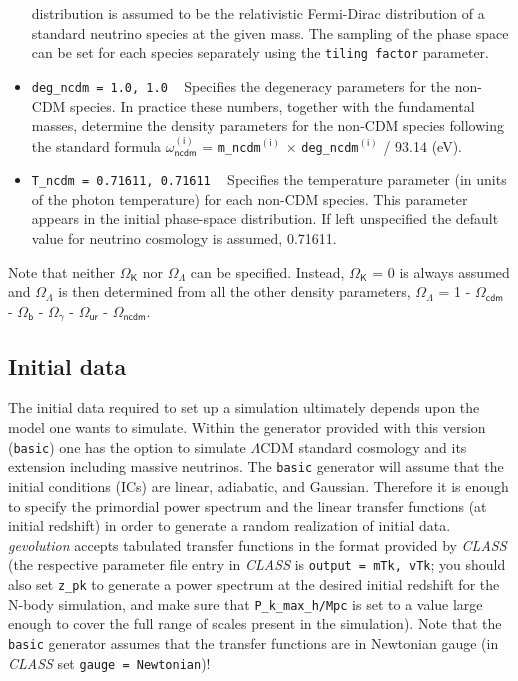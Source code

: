 \documentclass[a4paper,10pt]{article}
\begin{document}
\begin{itemize}
 distribution is assumed to be the relativistic Fermi-Dirac distribution of a standard neutrino species at the given mass. The sampling
 of the phase space can be set for each species separately using the \texttt{tiling factor} parameter.
 \item[] \hspace{-25pt}\texttt{deg\_ncdm = 1.0, 1.0} ~ Specifies the degeneracy parameters for the non-CDM species. In practice these
 numbers, together with the fundamental masses, determine the density parameters for the non-CDM species following the standard formula
 $\mathsf{\omega}_\mathsf{ncdm}^{\mathsf{(i)}}$ = \texttt{m\_ncdm}$^{\mathsf{(i)}}$ $\times$ \texttt{deg\_ncdm}$^{\mathsf{(i)}}$ / 93.14 (eV).
 \item[] \hspace{-25pt}\texttt{T\_ncdm = 0.71611, 0.71611} ~ Specifies the temperature parameter (in units of the photon temperature) for
 each non-CDM species. This parameter appears in the initial phase-space distribution. If left unspecified the default value for neutrino
 cosmology is assumed, 0.71611.
\end{itemize}
\noindent Note that neither $\mathsf{\Omega}_\mathsf{K}$ nor $\mathsf{\Omega}_\mathsf{\Lambda}$ can be specified. Instead,
$\mathsf{\Omega}_\mathsf{K}$ = 0 is always assumed and $\mathsf{\Omega}_\mathsf{\Lambda}$ is then determined from all the other density
parameters, $\mathsf{\Omega}_\mathsf{\Lambda}$ = 1 - $\mathsf{\Omega}_\mathsf{cdm}$ - $\mathsf{\Omega}_\mathsf{b}$ -
$\mathsf{\Omega}_\mathsf{\gamma}$ - $\mathsf{\Omega}_\mathsf{ur}$ - $\mathsf{\Omega}_\mathsf{ncdm}$.

\subsection{Initial data}
\label{sec:IC}

The initial data required to set up a simulation ultimately depends upon the model one wants to simulate. Within the generator provided with
this version (\texttt{basic}) one has the option to simulate $\mathsf{\Lambda}$CDM standard cosmology and its extension including massive
neutrinos. The \texttt{basic} generator will assume that the initial conditions (ICs) are linear, adiabatic, and Gaussian. Therefore it is
enough to specify the primordial power spectrum and the linear transfer functions (at initial redshift) in order to generate a random
realization of initial data.
\textit{gevolution} accepts tabulated transfer functions in the format provided by \textit{CLASS} (the respective parameter file entry in
\textit{CLASS} is \texttt{output = mTk, vTk}; you should also set \texttt{z\_pk} to generate a power spectrum at the desired initial
redshift for the N-body simulation, and make sure that \texttt{P\_k\_max\_h/Mpc} is set to a value large enough to cover the full range of
scales present in the simulation). Note that the \texttt{basic} 
generator assumes that the transfer functions are in Newtonian gauge (in \textit{CLASS} set \texttt{gauge = Newtonian})!
\end{document}
